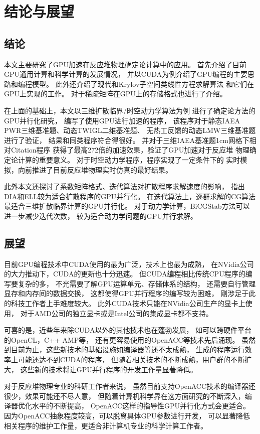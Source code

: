 
\chapter{结论与展望}

\section{结论}

本文主要研究了GPU加速在反应堆物理确定论计算中的应用。
首先介绍了目前GPU通用计算和科学计算的发展情况，
并以CUDA为例介绍了GPU编程的主要思路和编程模型。
此外还介绍了现代和Krylov子空间类线性方程求解算法
和它们在GPU上实现的工作。
对于稀疏矩阵在GPU上的存储格式也进行了介绍。

在上面的基础上，本文以三维扩散临界/时空动力学算法为例
进行了确定论方法的GPU并行化研究，
编写了使用GPU进行加速的\ProgramName 程序，
该程序对于静态IAEA PWR三维基准题、动态TWIGL二维基准题、
无热工反馈的动态LMW三维基准题进行了验证，
结果和同类程序符合得很好。
并对于三维IAEA基准题1cm网格下相对Citation程序
获得了最高272倍的加速效果，验证了GPU加速对于反应堆
物理确定论计算的重要意义。
对于时空动力学程序，\ProgramName 程序实现了一定条件下的
实时模拟，向前推进了目前反应堆物理实时仿真的最好结果。

此外本文还探讨了系数矩阵格式、迭代算法对扩散程序求解速度的影响，
指出DIA和ELL较为适合扩散程序的GPU并行化。
在迭代算法上，逐群求解的CG算法最适合三维扩散临界计算的GPU并行化。
对于动力学计算，BiCGStab方法可以进一步减少迭代次数，
较为适合动力学问题的GPU并行求解。

\section{展望}

目前GPU编程技术中CUDA使用的最为广泛，技术上也最为成熟，
在NVidia公司的大力推动下，CUDA的更新也十分迅速。
但CUDA编程相比传统CPU程序的编写要复杂的多，
不光需要了解GPU运算单元、存储体系的结构，
还需要自行管理显存和内存间的数据交换，
这都使得GPU并行程序的编写较为困难，
刚涉足于此的科技工作者上手难度较大。
此外CUDA技术只能在NVidia公司生产的显卡上使用，
对于AMD公司的独立显卡或是Intel公司的集成显卡都不支持。

可喜的是，近些年来除CUDA以外的其他技术也在蓬勃发展，
如可以跨硬件平台的OpenCL，C++ AMP等，
还有更容易使用的OpenACC等技术先后涌现。
虽然到目前为止，这些新技术的基础设施如编译器等还不太成熟，
生成的程序运行效率上可能还达不到CUDA的程序，
但随着相关技术的不断成熟，用户群的不断扩大，
这些新的技术将让GPU并行程序的开发工作量显著降低。

对于反应堆物理专业的科研工作者来说，
虽然目前支持OpenACC技术的编译器还很少，效果可能还不尽人意，
但随着计算机科学界在这方面研究的不断深入，编译器优化水平的不断提高，
OpenACC这样的指导性GPU并行化方式会更适合。
因为OpenACC抽象程度较高，可以脱离具体GPU参数进行开发，
可以显著降低相关程序的维护工作量，更适合非计算机专业的科学计算工作者。
